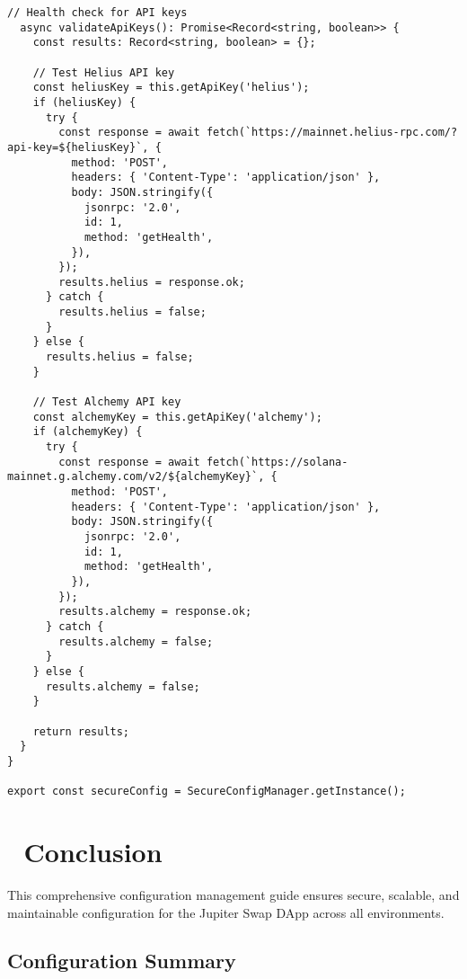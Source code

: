 \documentclass[11pt,a4paper]{article}
\begin{document}
\begin{lstlisting}[style=env, caption=API Key Security Best Practices]
  // Health check for API keys
  async validateApiKeys(): Promise<Record<string, boolean>> {
    const results: Record<string, boolean> = {};
    
    // Test Helius API key
    const heliusKey = this.getApiKey('helius');
    if (heliusKey) {
      try {
        const response = await fetch(`https://mainnet.helius-rpc.com/?api-key=${heliusKey}`, {
          method: 'POST',
          headers: { 'Content-Type': 'application/json' },
          body: JSON.stringify({
            jsonrpc: '2.0',
            id: 1,
            method: 'getHealth',
          }),
        });
        results.helius = response.ok;
      } catch {
        results.helius = false;
      }
    } else {
      results.helius = false;
    }
    
    // Test Alchemy API key
    const alchemyKey = this.getApiKey('alchemy');
    if (alchemyKey) {
      try {
        const response = await fetch(`https://solana-mainnet.g.alchemy.com/v2/${alchemyKey}`, {
          method: 'POST',
          headers: { 'Content-Type': 'application/json' },
          body: JSON.stringify({
            jsonrpc: '2.0',
            id: 1,
            method: 'getHealth',
          }),
        });
        results.alchemy = response.ok;
      } catch {
        results.alchemy = false;
      }
    } else {
      results.alchemy = false;
    }
    
    return results;
  }
}

export const secureConfig = SecureConfigManager.getInstance();
\end{lstlisting}

\section{🎯 Conclusion}

This comprehensive configuration management guide ensures secure, scalable, and maintainable configuration for the Jupiter Swap DApp across all environments.

\subsection{Configuration Summary}
\end{document}
